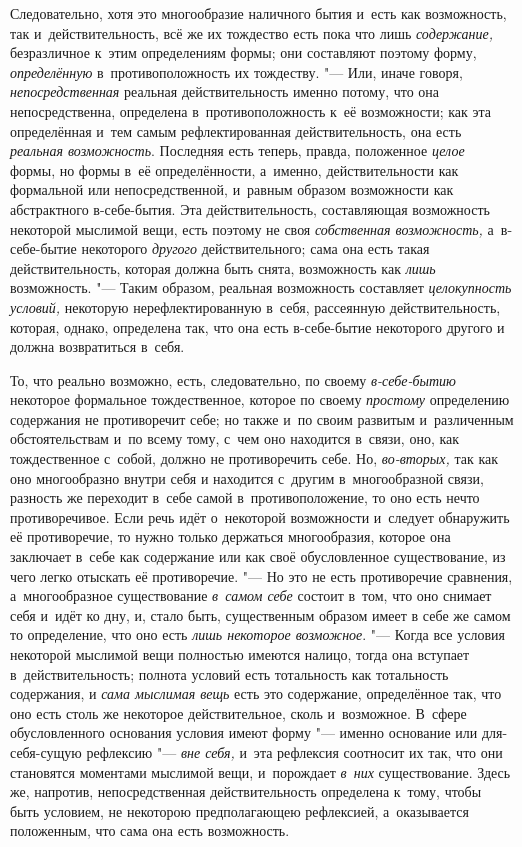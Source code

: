 Следовательно, хотя это многообразие наличного бытия и~есть как возможность,
так и~действительность, всё же их тождество есть пока что лишь
{\em содержание,} безразличное к~этим определениям
формы; они составляют поэтому форму, {\em определённую}
в~противоположность их тождеству. "--- Или, иначе говоря,
{\em непосредственная} реальная действительность именно
потому, что она непосредственна, определена в~противоположность к~её
возможности; как эта определённая и~тем самым рефлектированная
действительность, она есть {\em реальная возможность}.
Последняя есть теперь, правда, положенное {\em целое}
формы, но формы в~её определённости, а~именно, действительности как
формальной или непосредственной, и~равным образом возможности как
абстрактного в-себе-бытия. Эта действительность, составляющая возможность
некоторой мыслимой вещи, есть поэтому не своя
{\em собственная возможность,} а~в-себе-бытие
некоторого {\em другого} действительного; сама она есть
такая действительность, которая должна быть снята, возможность как
{\em лишь} возможность. "--- Таким образом, реальная
возможность составляет {\em целокупность условий,}
некоторую нерефлектированную в~себя, рассеянную действительность, которая,
однако, определена так, что она есть в-себе-бытие некоторого другого и
должна возвратиться в~себя.

То, что реально возможно, есть, следовательно, по своему
{\em в-себе-бытию} некоторое формальное тождественное,
которое по своему {\em простому} определению содержания
не противоречит себе; но также и~по своим развитым и~различенным
обстоятельствам и~по всему тому, с~чем оно находится в~связи, оно, как
тождественное с~собой, должно не противоречить себе. Но,
{\em во-вторых,} так как оно многообразно внутри себя и
находится с~другим в~многообразной связи, разность же переходит в~себе
самой в~противоположение, то оно есть нечто противоречивое. Если речь идёт
о~некоторой возможности и~следует обнаружить её противоречие, то нужно
только держаться многообразия, которое она заключает в~себе как содержание
или как своё обусловленное существование, из чего легко отыскать её
противоречие. "--- Но это не есть противоречие сравнения, а~многообразное
существование {\em в~самом себе} состоит в~том, что оно
снимает себя и~идёт ко дну, и, стало быть, существенным образом имеет в
себе же самом то определение, что оно есть {\em лишь
некоторое возможное}. "--- Когда все условия некоторой мыслимой вещи полностью
имеются налицо, тогда она вступает в~действительность; полнота условий есть
тотальность как тотальность содержания, и {\em сама
мыслимая вещь} есть это содержание, определённое так, что оно есть столь же
некоторое действительное, сколь и~возможное. В~сфере обусловленного
основания условия имеют форму "--- именно основание или для-себя-сущую
рефлексию "--- {\em вне себя,} и~эта рефлексия соотносит
их так, что они становятся моментами мыслимой вещи, и~порождает
{\em в~них} существование. Здесь же, напротив,
непосредственная действительность определена к~тому, чтобы быть условием,
не некоторою предполагающею рефлексией, а~оказывается положенным, что сама
она есть возможность.

